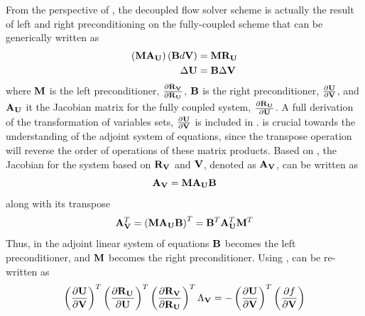 From the perspective of , the decoupled flow solver scheme
is actually the result of left and right preconditioning on the fully-coupled
scheme that can be generically written as
\begin{equation}
  \begin{aligned}
    \left(\mathbf M \mathbf A_{\mathbf U} \right) \left( \mathbf B d\mathbf V \right) &= \mathbf M \mathbf R_{{\mathbf U}_{}} \\
    \Delta \mathbf U &= \mathbf B \Delta \mathbf V
  \end{aligned}
  \label{generic-fc-to-dc}
\end{equation}
where $\mathbf M$ is the left preconditioner, $\frac{\partial \mathbf R_{{\mathbf V}_{}}}{\partial \mathbf R_{{\mathbf U}_{}}}$, $\mathbf B$ is the right
preconditioner, $\frac{\partial \mathbf U}{\partial \mathbf V}$, and $\mathbf A_{\mathbf U}$ it the Jacobian matrix for the
fully coupled system, $\frac{\partial \mathbf R_{{\mathbf U}_{}}}{\partial \mathbf U}$.  A full derivation of the
transformation of variables sets, $\frac{\partial \mathbf U}{\partial \mathbf V}$ is included in
.
 is crucial towards the understanding of the adjoint
system of equations, since the transpose operation will reverse the order of
operations of these matrix products.  Based on , the
Jacobian for the system based on $\mathbf R_{{\mathbf V}_{}}$ and $\mathbf V$, denoted as $\mathbf A_{\mathbf V}$, can
be written as
\begin{equation}
  \mathbf A_{\mathbf V} = \mathbf M \mathbf A_{\mathbf U} \mathbf B
  \label{adj-dc-generic}
\end{equation}
along with its transpose
\begin{equation}
  \mathbf A_{\mathbf V}^{T}
   = \left( \mathbf M \mathbf A_{\mathbf U} \mathbf B \right)^{T}
   = \mathbf B^{T} \mathbf A_{\mathbf U}^{T} \mathbf M^{T}
  \label{adj-dc-generic-transpose}
\end{equation}
Thus, in the adjoint linear system of equations $\mathbf B$ becomes the left
preconditioner, and $\mathbf M$ becomes the right preconditioner.  Using
,  can be re-written as
\begin{equation}
  \left( \frac{\partial \mathbf U}{\partial \mathbf V} \right)^{T}
  \left(\frac{\partial \mathbf R_{{\mathbf U}_{}}}{\partial \mathbf U} \right)^{T} 
  \left( \frac{\partial \mathbf R_{{\mathbf V}_{}}}{\partial \mathbf R_{{\mathbf U}_{}}} \right)^{T}
  \Lambda_{\mathbf V} 
  = 
  - \left( \frac{\partial \mathbf U}{\partial \mathbf V} \right)^{T}
  \left( \frac{\partial f}{\partial \mathbf V} \right)
  \label{adj-u-to-v}
\end{equation}
